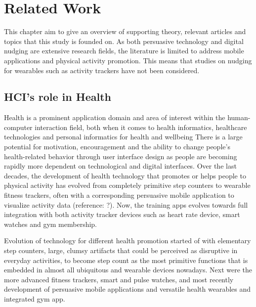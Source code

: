 \chapter{Related Work}

This chapter aim to give an overview of supporting theory, relevant articles and topics that this study is founded on. As both persuasive technology and digital nudging are extensive research fields, the literature is limited to address mobile applications and physical activity promotion. This means that studies on nudging for wearables such as activity trackers have not been considered.

\section{HCI's role in Health}
Health is a prominent application domain and area of interest within the human-computer interaction field, both when it comes to health informatics, healthcare technologies and personal informatics for health and wellbeing 
\cite{wilson_human-computer_2015}
There is a large potential for motivation, encouragement and the ability to change people’s health-related behavior through user interface design as people are becoming rapidly more dependent on technological and digital interfaces. Over the last decades, the development of health technology that promotes or helps people to physical activity has evolved from completely primitive step counters to wearable fitness trackers, often with a corresponding persuasive mobile application to visualize activity data (reference: ?). Now, the training apps evolves towards full integration with both activity tracker devices such as heart rate device, smart watches and gym membership. 

Evolution of technology for different health promotion started of with elementary step counters, large, clumsy artifacts that could be perceived as disruptive in everyday activities, to become step count as the most primitive functions that is embedded in almost all ubiquitous and wearable devices nowadays. Next were the more advanced fitness trackers, smart and pulse watches, and most recently development of persuasive mobile applications and versatile health wearables and integrated gym app.

